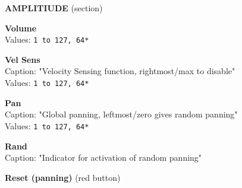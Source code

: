 \documentclass[
 11pt,
 twoside,
 a4paper,
 headinclude,
 footinclude,
 final                                 %
]{article}
\begin{document}
\begin{enumber}
\begin{enumber}
\begin{enumber}
         \item \textbf{AMPLITIUDE} (section)
         \begin{enumber}
            \item \textbf{Volume} \\
               Values: \texttt{1 to 127, 64*}
            \item \textbf{Vel Sens} \\
               Caption: "Velocity Sensing function, rightmost/max to disable" \\
               Values: \texttt{1 to 127, 64*}
            \item \textbf{Pan} \\
               Caption: "Global panning, leftmost/zero gives random panning" \\
               Values: \texttt{1 to 127, 64*}
            \item \textbf{Rand} \\
               Caption: "Indicator for activation of random panning"
            \item \textbf{Reset (panning)} (red button)



\end{enumber}
\end{enumber}
\end{enumber}
\end{enumber}
\end{document}
